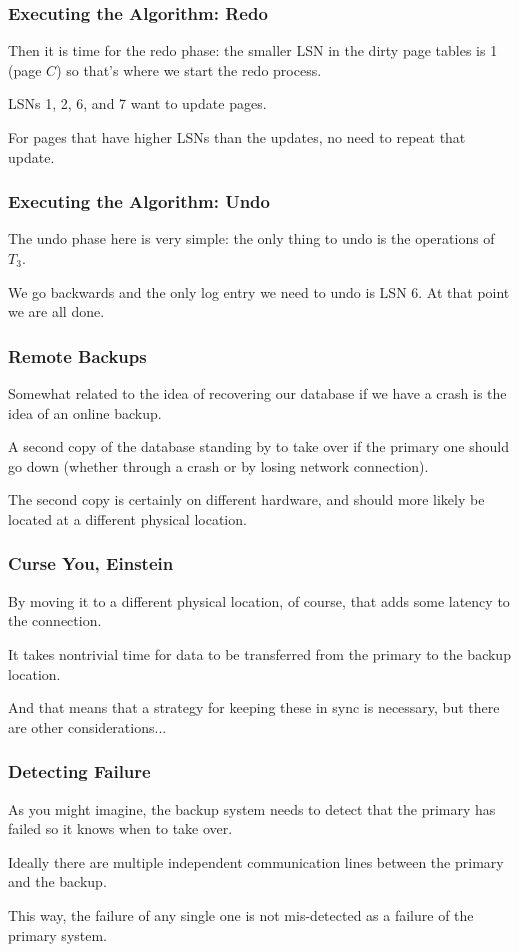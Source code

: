 \begin{frame}
\frametitle{Executing the Algorithm: Redo}

Then it is time for the redo phase: the smaller LSN in the dirty page tables is 1 (page $C$) so that's where we start the redo process. 

LSNs 1, 2, 6, and 7 want to update pages. 

For pages that have higher LSNs than the updates, no need to repeat that update.


\end{frame}


\begin{frame}
\frametitle{Executing the Algorithm: Undo}

The undo phase here is very simple: the only thing to undo is the operations of $T_{3}$. 

We go backwards and the only log entry we need to undo is LSN 6. At that point we are all done.


\end{frame}


\begin{frame}
\frametitle{Remote Backups}

Somewhat related to the idea of recovering our database if we have a crash is the idea of an online backup. 

A second copy of the database standing by to take over if the primary one should go down (whether through a crash or by losing network connection). 

The second copy is certainly on different hardware, and should more likely be located at a different physical location. 

\end{frame}


\begin{frame}
\frametitle{Curse You, Einstein}

By moving it to a different physical location, of course, that adds some latency to the connection. 

It takes nontrivial time for data to be transferred from the primary to the backup location. 

And that means that a strategy for keeping these in sync is necessary, but there are other considerations...

\end{frame}


\begin{frame}
\frametitle{Detecting Failure}

 As you might imagine, the backup system needs to detect that the primary has failed so it knows when to take over. 
 
 Ideally there are multiple independent communication lines between the primary and the backup.
 
This way, the failure of any single one is not mis-detected as a failure of the primary system.

\end{frame}


